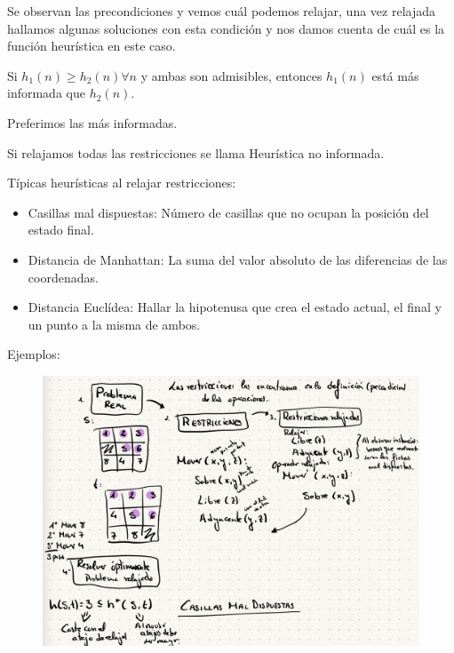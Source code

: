 \documentclass[12pt, twoside, openright]{report} %
\begin{document}
	Se observan las precondiciones y vemos cuál podemos relajar, una vez
    relajada hallamos algunas soluciones con esta condición y nos damos
    cuenta de cuál es la función heurística en este caso.

	Si \(h_1(n)\geq h_2(n) \forall n\) y ambas son admisibles, entonces
    \(h_1(n)\) está más informada que \(h_2(n)\).

    Preferimos las más informadas.

	Si relajamos todas las restricciones se llama Heurística no
    informada.

	Típicas heurísticas al relajar restricciones:

    \begin{itemize}
  
    \item
      Casillas mal dispuestas: Número de casillas que no ocupan la
      posición del estado final.
    \item
      Distancia de Manhattan: La suma del valor absoluto de las
      diferencias de las coordenadas.
    \item
      Distancia Euclídea: Hallar la hipotenusa que crea el estado
      actual, el final y un punto a la misma de ambos.
    \end{itemize}
\pagebreak
	Ejemplos:
	\begin{figure}[H]
		{\includegraphics[scale=.22]{Untitled 52.png}}
	\end{figure}
\end{document}
